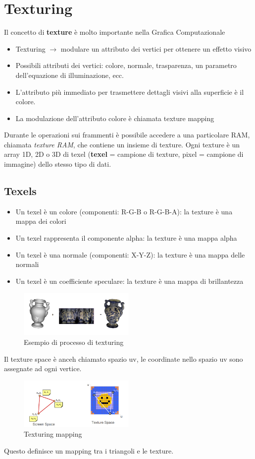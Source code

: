 \section{Texturing}
Il concetto di \textbf{texture} è molto importante nella Grafica Computazionale \\
\begin{itemize}
    \item Texturing $\rightarrow$ modulare un attributo dei vertici per ottenere un effetto visivo
    \item Possibili attributi dei vertici: colore, normale, trasparenza, un parametro dell'equazione di illuminazione, ecc.
    \item L'attributo più immediato per trasmettere dettagli visivi alla superficie è il colore.
    \item La modulazione dell'attributo colore è chiamata texture mapping
\end{itemize}
Durante le operazioni sui frammenti è possibile accedere a una particolare RAM, chiamata \textit{texture RAM}, che contiene un insieme di texture.
Ogni texture è un array 1D, 2D o 3D di texel (\textbf{texel} = campione di texture, pixel = campione di immagine) dello stesso tipo di dati.
\subsection{Texels}
\begin{itemize}
    \item Un texel è un colore (componenti: R-G-B o R-G-B-A): la texture è una mappa dei colori
    \item Un texel rappresenta il componente alpha: la texture è una mappa alpha
    \item Un texel è una normale (componenti: X-Y-Z): la texture è una mappa delle normali
    \item Un texel è un coefficiente speculare: la texture è una mappa di brillantezza
\end{itemize}
\begin{figure}[H]
    \centering
    \includegraphics[width=0.5\textwidth]{images/Texturing.png} 
    \caption{Esempio di processo di texturing}
    \label{fig:immagine}
\end{figure}
Il texture space è anceh chiamato spazio uv, le coordinate nello spazio uv sono assegnate ad ogni vertice.
\begin{figure}[H]
    \centering
    \includegraphics[width=0.5\textwidth]{images/TextMap.png} 
    \caption{Texturing mapping}
    \label{fig:immagine}
\end{figure}
Questo definisce un mapping tra i triangoli e le texture.
